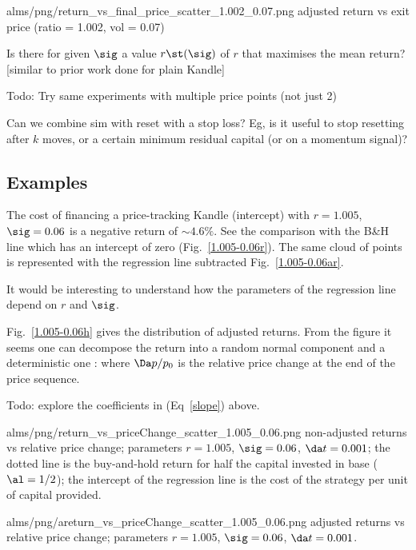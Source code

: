 \documentclass[oneside,twocolumn,12pt]{article}
\begin{document}
\IG{150pt}
{alms/png/return_vs_final_price_scatter_1.002_0.07.png}
{adjusted return vs exit price (ratio = 1.002, vol = 0.07)}

\QS[1] Is there for given $\sig$ a value $r\st(\sig)$ of $r$ that maximises the mean return? [similar to prior work done
for plain Kandle]

Todo: Try same experiments with multiple price points (not just 2)

Can we combine sim with reset with a stop loss? Eg, is it useful to stop resetting after $k$ moves,
or a certain minimum residual capital (or on a momentum signal)?


\subsection{Examples}
The cost of financing a price-tracking Kandle (intercept) with $r=1.005$, $\sig=0.06$ is a negative return of 
$\sim 4.6\%$. See the comparison with the B\&H line which has an intercept of zero (Fig.~\ref{1.005-0.06r}).
The same cloud of points is represented with the regression line subtracted Fig.~\ref{1.005-0.06ar}.

It would be interesting to understand how the parameters of the regression line depend on $r$ and $\sig$.

Fig.~\ref{1.005-0.06h} gives the distribution of adjusted returns. 
From the figure it seems one can decompose the return into a random normal component
and a deterministic one      :
where $\Da p/p_0$ is the relative price change at the end of the price sequence.

Todo: explore the coefficients in (Eq~\ref{slope}) above.

\IG{150pt}
{alms/png/return_vs_priceChange_scatter_1.005_0.06.png}
{\label{1.005-0.06r} non-adjusted returns vs relative price change;
parameters $r=1.005$, $\sig=0.06$, $\da t = 0.001$; 
the dotted line is the buy-and-hold
return for half the capital invested in base ($\al=1/2$); the intercept of the regression line 
is the cost of the strategy per unit of capital provided.}

\IG{150pt}
{alms/png/areturn_vs_priceChange_scatter_1.005_0.06.png}
{\label{1.005-0.06ar} adjusted returns vs relative price change; 
parameters $r=1.005$, $\sig=0.06$, $\da t = 0.001$.}
\end{document}
